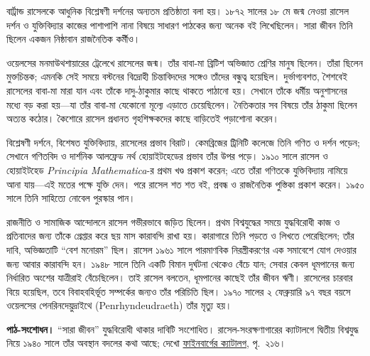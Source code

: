 \documentclass[../../../include/open-logic-section]{subfiles}
\begin{document}



বার্ট্রান্ড রাসেলকে আধুনিক বিশ্লেষণী দর্শনের
অন্যতম প্রতিষ্ঠাতা বলা হয়। ১৮৭২ সালের ১৮ মে
জন্ম নেওয়া রাসেল দর্শন ও যুক্তিবিদ্যার কাজের
পাশাপাশি নানা বিষয়ে সাধারণ পাঠকের জন্য
অনেক বই লিখেছিলেন। সারা জীবন তিনি ছিলেন
একজন নিষ্ঠাবান রাজনৈতিক কর্মীও।

ওয়েলসের মনমাউথশায়ারের ট্রেলেখে রাসেলের জন্ম।
তাঁর বাবা-মা ব্রিটিশ অভিজাত শ্রেণির মানুষ
ছিলেন। তাঁরা ছিলেন মুক্তচিন্তক; এমনকি সেই
সময়ে বস্টনের বিদ্রোহী চিন্তাবিদদের সঙ্গেও
তাঁদের বন্ধুত্ব হয়েছিল। দুর্ভাগ্যবশত, শৈশবেই
রাসেলের বাবা-মা মারা যান এবং তাঁকে
দাদু-ঠাকুমার কাছে থাকতে পাঠানো হয়।
সেখানে তাঁকে ধর্মীয় অনুশাসনের মধ্যে বড়
করা হয়—যা তাঁর বাবা-মা যেকোনো মূল্যে
এড়াতে চেয়েছিলেন। নৈতিকতার সব বিষয়ে
তাঁর ঠাকুমা ছিলেন অত্যন্ত কঠোর। কৈশোরে
রাসেল প্রধানত গৃহশিক্ষকদের কাছে বাড়িতেই
পড়াশোনা করেন।

বিশ্লেষণী দর্শনে, বিশেষত যুক্তিবিদ্যায়,
রাসেলের প্রভাব বিরাট। কেমব্রিজের ট্রিনিটি
কলেজে তিনি গণিত ও দর্শন পড়েন; সেখানে
গণিতবিদ ও দার্শনিক আলফ্রেড নর্থ
হোয়াইটহেডের প্রভাব তাঁর উপর পড়ে।
১৯১০ সালে রাসেল ও হোয়াইটহেড
\emph{Principia Mathematica}-র প্রথম খণ্ড
প্রকাশ করেন; এতে তাঁরা গণিতকে যুক্তিবিদ্যায়
নামিয়ে আনা যায়—এই মতের পক্ষে যুক্তি
দেন। পরে রাসেল শত শত বই, প্রবন্ধ ও
রাজনৈতিক পুস্তিকা প্রকাশ করেন। ১৯৫০
সালে তিনি সাহিত্যে নোবেল পুরস্কার পান।

রাজনীতি ও সামাজিক আন্দোলনে রাসেল
গভীরভাবে জড়িত ছিলেন। প্রথম বিশ্বযুদ্ধের
সময়ে যুদ্ধবিরোধী কাজ ও প্রতিবাদের জন্য
তাঁকে গ্রেপ্তার করে ছয় মাস কারাবন্দি রাখা
হয়। কারাগারে তিনি পড়তে ও লিখতে
পেরেছিলেন; তাঁর দাবি, অভিজ্ঞতাটি
“বেশ মনোরম” ছিল। রাসেল ১৯৬১ সালে পারমাণবিক
নিরস্ত্রীকরণের এক সমাবেশে যোগ দেওয়ার
জন্য আবার কারাবন্দি হন। ১৯৪৮ সালে
তিনি একটি বিমান দুর্ঘটনা থেকেও বেঁচে
যান; সেবার কেবল ধূমপানের জন্য
নির্ধারিত অংশের যাত্রীরাই বেঁচেছিলেন।
তাই রাসেল বলতেন, ধূমপানের কাছেই
তাঁর জীবন ঋণী। রাসেলের চারবার বিয়ে
হয়েছিল, তবে বিবাহবহির্ভূত সম্পর্কের জন্যও
তাঁর পরিচিতি ছিল। ১৯৭০ সালের ২
ফেব্রুয়ারি ৯৭ বছর বয়সে ওয়েলসের
পেনরিনদেয়ুদ্রাইথে (Penrhyndeudraeth)
তাঁর মৃত্যু হয়।
\par\noindent\textbf{পাঠ-সংশোধন।} “সারা জীবন” যুদ্ধবিরোধী থাকার দাবিটি সংশোধিত।
রাসেল-সংরক্ষণাগারের ক্যাটালগে দ্বিতীয় বিশ্বযুদ্ধ নিয়ে ১৯৪০ সালে
তাঁর অবস্থান বদলের কথা আছে; দেখো
\href{https://www.mcmaster.ca/russdocs/Feinberg\%20RA1\%20Catalogue.pdf}{ফাইনবার্গের ক্যাটালগ}, পৃ.~২১৬।
\end{document}
